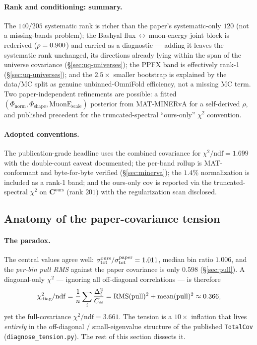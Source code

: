 \paragraph{Rank and conditioning: summary.}
The $140/205$ systematic rank is richer than the
paper's systematic-only $120$ (not a missing-bands problem); the Bashyal
flux\,$\leftrightarrow$\,muon-energy joint block is rederived ($\rho=0.900$)
and carried as a diagnostic --- adding it leaves the systematic rank
unchanged, its directions already lying within the span of the universe
covariance (\S\ref{sec:uq-universes}); the PPFX band is effectively rank-1
(\S\ref{sec:uq-universes}); and the $2.5\times$ smaller bootstrap is explained by
the data/MC split as genuine unbinned-OmniFold efficiency, not a missing MC term.
Two paper-independent refinements are possible: a fitted
$(\Phi_{\text{norm}},\Phi_{\text{shape}},\text{MuonE}_{\text{scale}})$ posterior
from MAT-MINERvA for a self-derived $\rho$, and published precedent for the
truncated-spectral ``ours-only'' $\chi^{2}$ convention.

\paragraph{Adopted conventions.}
The publication-grade headline uses the combined covariance for
$\chi^{2}/\mathrm{ndf}=1.699$ with the double-count caveat documented;
the per-band rollup is MAT-conformant and byte-for-byte verified
(\S\ref{sec:minerva}); the $1.4\%$ normalization is included as a
rank-1 band; and the ours-only cov is reported via the truncated-spectral
$\chi^{2}$ on $\mathbf{C}^{\mathrm{ours}}$ (rank $201$) with the
regularization scan disclosed.

\subsection{Anatomy of the paper-covariance tension}
\label{sec:tension}

\paragraph{The paradox.}
The central values agree well: $\sigma_{\text{tot}}^{\text{ours}}/\sigma_{\text{tot}}^{\text{paper}}
= 1.011$, median bin ratio $1.006$, and the \emph{per-bin pull RMS}
against the paper covariance is only $0.598$ (\S\ref{sec:pull}).
A diagonal-only $\chi^{2}$ --- ignoring all off-diagonal correlations ---
is therefore
\begin{equation}
\chi^{2}_{\mathrm{diag}}/\mathrm{ndf}
= \frac{1}{n}\sum_{i}\frac{\Delta_{i}^{2}}{C_{ii}}
= \mathrm{RMS}(\mathrm{pull})^{2} + \mathrm{mean}(\mathrm{pull})^{2}
\approx 0.366,
\end{equation}
yet the full-covariance $\chi^{2}/\mathrm{ndf}=3.661$. The tension is a
$10\times$ inflation that lives \emph{entirely} in the off-diagonal /
small-eigenvalue structure of the published \texttt{TotalCov}
(\texttt{diagnose\_tension.py}). The rest of this section dissects it.

